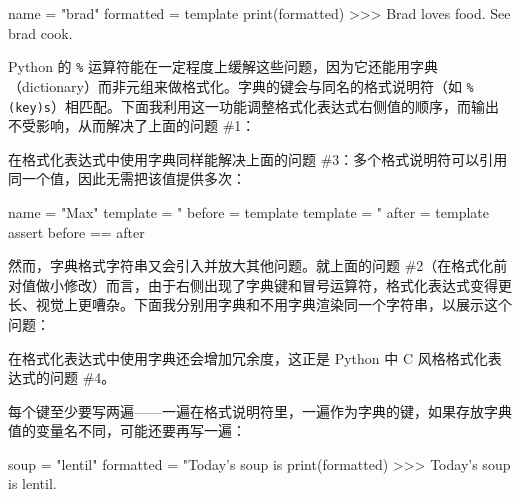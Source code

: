 \begin{codebox}[python]
name = "brad"
formatted = template %
print(formatted)
>>>
Brad loves food. See brad cook.
\end{codebox}

Python 的 \texttt{\%} 运算符能在一定程度上缓解这些问题，因为它还能用字典（dictionary）而非元组来做格式化。字典的键会与同名的格式说明符（如 \texttt{\%(key)s}）相匹配。下面我利用这一功能调整格式化表达式右侧值的顺序，而输出不受影响，从而解决了上面的问题 \#1：


在格式化表达式中使用字典同样能解决上面的问题 \#3：多个格式说明符可以引用同一个值，因此无需把该值提供多次：

\begin{codebox}[python]
name = "Max"
template = "%
before = template %
template = "%
after = template %
assert before == after
\end{codebox}

然而，字典格式字符串又会引入并放大其他问题。就上面的问题 \#2（在格式化前对值做小修改）而言，由于右侧出现了字典键和冒号运算符，格式化表达式变得更长、视觉上更嘈杂。下面我分别用字典和不用字典渲染同一个字符串，以展示这个问题：


在格式化表达式中使用字典还会增加冗余度，这正是 Python 中 C 风格格式化表达式的问题 \#4。

每个键至少要写两遍——一遍在格式说明符里，一遍作为字典的键，如果存放字典值的变量名不同，可能还要再写一遍：

\begin{codebox}[python]
soup = "lentil"
formatted = "Today's soup is %
print(formatted)
>>>
Today's soup is lentil.
\end{codebox}

